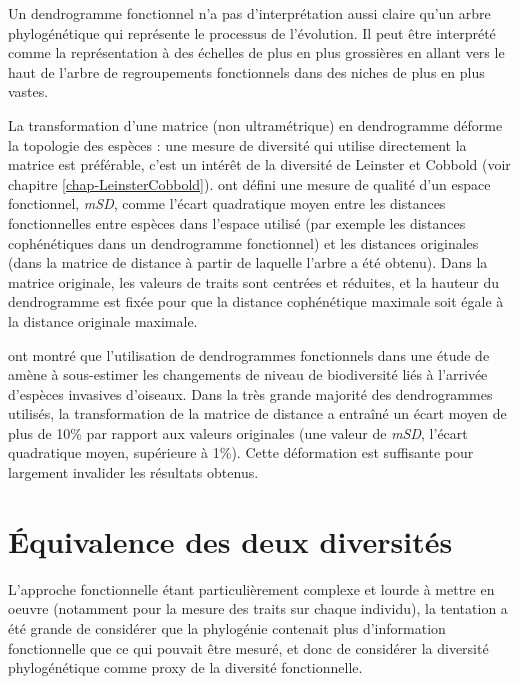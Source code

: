 \documentclass[
  11pt,
  french,
  a4paper,
  extrafontsizes,onecolumn,openright
  ]{memoir}
\begin{document}
Un dendrogramme fonctionnel n'a pas d'interprétation aussi claire qu'un arbre phylogénétique qui représente le processus de l'évolution.
Il peut être interprété comme la représentation à des échelles de plus en plus grossières en allant vers le haut de l'arbre de regroupements fonctionnels dans des niches de plus en plus vastes.

La transformation d'une matrice (non ultramétrique) en dendrogramme déforme la topologie des espèces \autocite{Pavoine2005a,Podani2007}: une mesure de diversité qui utilise directement la matrice est préférable, c'est un intérêt de la diversité de Leinster et Cobbold (voir chapitre \ref{chap-LeinsterCobbold}).
\textcite{Maire2015} ont défini une mesure de qualité d'un espace fonctionnel, \emph{mSD}, comme l'écart quadratique moyen entre les distances fonctionnelles entre espèces dans l'espace utilisé (par exemple les distances cophénétiques dans un dendrogramme fonctionnel) et les distances originales (dans la matrice de distance à partir de laquelle l'arbre a été obtenu).
Dans la matrice originale, les valeurs de traits sont centrées et réduites, et la hauteur du dendrogramme est fixée pour que la distance cophénétique maximale soit égale à la distance originale maximale.

\textcite{Villeger2017} ont montré que l'utilisation de dendrogrammes fonctionnels dans une étude de \textcite{Sobral2016} amène à sous-estimer les changements de niveau de biodiversité liés à l'arrivée d'espèces invasives d'oiseaux.
Dans la très grande majorité des dendrogrammes utilisés, la transformation de la matrice de distance a entraîné un écart moyen de plus de 10\% par rapport aux valeurs originales (une valeur de \emph{mSD}, l'écart quadratique moyen, supérieure à 1\%).
Cette déformation est suffisante pour largement invalider les résultats obtenus.

\section{Équivalence des deux diversités}\label{uxe9quivalence-des-deux-diversituxe9s}

L'approche fonctionnelle étant particulièrement complexe et lourde à mettre en oeuvre (notamment pour la mesure des traits sur chaque individu), la tentation a été grande de considérer que la phylogénie contenait plus d'information fonctionnelle que ce qui pouvait être mesuré, et donc de considérer la diversité phylogénétique comme proxy de la diversité fonctionnelle.
\end{document}
